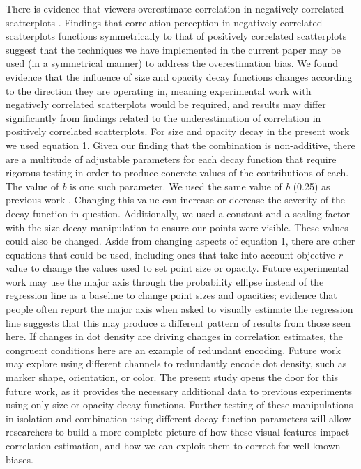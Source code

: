 \documentclass[manuscript, review, anonymous, screen]{acmart}
\begin{document}
There is evidence that viewers overestimate correlation in negatively
correlated scatterplots \citep{sher_2017}. Findings that correlation
perception in negatively correlated scatterplots functions symmetrically
to that of positively correlated scatterplots \citep{harrison_2014}
suggest that the techniques we have implemented in the current paper may
be used (in a symmetrical manner) to address the overestimation bias. We
found evidence that the influence of size and opacity decay functions
changes according to the direction they are operating in, meaning
experimental work with negatively correlated scatterplots would be
required, and results may differ significantly from findings related to
the underestimation of correlation in positively correlated
scatterplots. For size and opacity decay in the present work we used
equation 1. Given our finding that the combination is non-additive,
there are a multitude of adjustable parameters for each decay function
that require rigorous testing in order to produce concrete values of the
contributions of each. The value of \emph{b} is one such parameter. We
used the same value of \emph{b} (0.25) as previous work
\citep{strain_2023, strain_2023b}. Changing this value can increase or
decrease the severity of the decay function in question. Additionally,
we used a constant and a scaling factor with the size decay manipulation
to ensure our points were visible. These values could also be changed.
Aside from changing aspects of equation 1, there are other equations
that could be used, including ones that take into account objective
\emph{r} value to change the values used to set point size or opacity.
Future experimental work may use the major axis through the probability
ellipse instead of the regression line as a baseline to change point
sizes and opacities; evidence that people often report the major axis
when asked to visually estimate the regression line \citep{collyer_1990}
suggests that this may produce a different pattern of results from those
seen here. If changes in dot density are driving changes in correlation
estimates, the congruent conditions here are an example of redundant
encoding. Future work may explore using different channels to
redundantly encode dot density, such as marker shape, orientation, or
color. The present study opens the door for this future work, as it
provides the necessary additional data to previous experiments using
only size \citep{strain_2023b} or opacity \citep{strain_2023} decay
functions. Further testing of these manipulations in isolation and
combination using different decay function parameters will allow
researchers to build a more complete picture of how these visual
features impact correlation estimation, and how we can exploit them to
correct for well-known biases.
\end{document}
